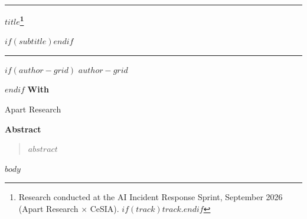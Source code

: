 \documentclass[11pt,letterpaper]{article}
\begin{document}
\noindent\rule{\textwidth}{1.2pt}\par
\vspace{10pt}
\begin{center}
{\LARGE\bfseries $title$\footnote{Research conducted at the AI Incident Response Sprint, September 2026 (Apart Research × CeSIA). $if(track)$$track$.$endif$}\par}
$if(subtitle)$\vspace{6pt}{\large $subtitle$\par}$endif$
\end{center}
\vspace{8pt}
\noindent\rule{\textwidth}{1.2pt}\par
\vspace{14pt}
\begin{center}
$if(author-grid)$
$author-grid$
\par
$endif$
\vspace{10pt}
{\bfseries With}\par
Apart Research\par
\end{center}
\vspace{14pt}
\begin{center}{\bfseries Abstract}\end{center}
\vspace{2pt}
\begin{quote}
$abstract$
\end{quote}
\vspace{6pt}
$body$
\end{document}

